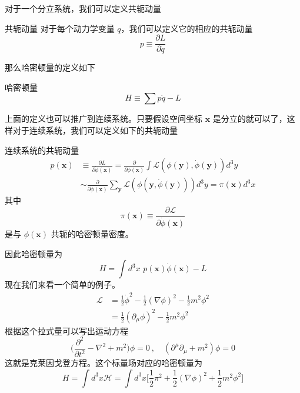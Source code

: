 对于一个分立系统，我们可以定义共轭动量
\begin{definition}{共轭动量}
对于每个动力学变量 $q$，我们可以定义它的相应的共轭动量
\begin{equation}
p \equiv \frac{\partial L}{\partial \dot q}
\end{equation}
\end{definition}
那么哈密顿量的定义如下
\begin{definition}{哈密顿量}
\begin{equation}\label{classi_eq1}
H \equiv \sum p \dot q - L
\end{equation}
\end{definition}
上面的定义也可以推广到连续系统。只要假设空间坐标 $\mathbf x$ 是分立的就可以了，这样对于连续系统，我们可以定义如下的共轭动量
\begin{definition}{连续系统的共轭动量}
\begin{equation}
\begin{aligned}
p(\mathbf x) & \equiv \frac{\partial L}{\partial \dot \phi(\mathbf x)} = \frac{\partial}{\partial \dot \phi(\mathbf x)} \int \mathcal L(\phi(\mathbf y),\dot \phi(\mathbf y)) d^3 y \\
& \sim \frac{\partial}{\partial \dot \phi(\mathbf x)} \sum_{\mathbf y} \mathcal L(\phi(\mathbf y,\dot \phi(\mathbf y))) d^3 y=\pi(\mathbf x) d^3 x
\end{aligned}
\end{equation}
其中
\begin{equation}
\pi(\mathbf x) \equiv \frac{\partial \mathcal L}{\partial \dot \phi(\mathbf x)}
\end{equation}
是与 $\phi(\mathbf x)$ 共轭的哈密顿量密度。
\end{definition}
因此哈密顿量为
\begin{equation}
H = \int d^3 x\,\, p(\mathbf x) \dot \phi(\mathbf x) - L
\end{equation}
现在我们来看一个简单的例子。
\begin{align}\nonumber
\mathcal L & = \frac{1}{2} \dot \phi^2 - \frac{1}{2} (\nabla \phi)^2 - \frac{1}{2} m^2 \phi^2 \\
& = \frac{1}{2} (\partial_\mu\phi)^2 - \frac{1}{2} m^2 \phi^2
\end{align}
根据这个拉式量可以写出运动方程
\begin{equation}
\bigg( \frac{\partial^2}{\partial t^2} - \nabla^2 +m^2 \bigg)\phi = 0~,\quad (\partial^\mu\partial_\mu+m^2)\phi = 0
\end{equation}
这就是克莱因戈登方程。这个标量场对应的哈密顿量为
\begin{equation}
H =  \int d^3x \mathcal H = \int d^3 x \bigg[ \frac{1}{2} \pi^2 + \frac{1}{2} (\nabla \phi)^2 + \frac{1}{2} m^2 \phi^2 \bigg] 
\end{equation} 

